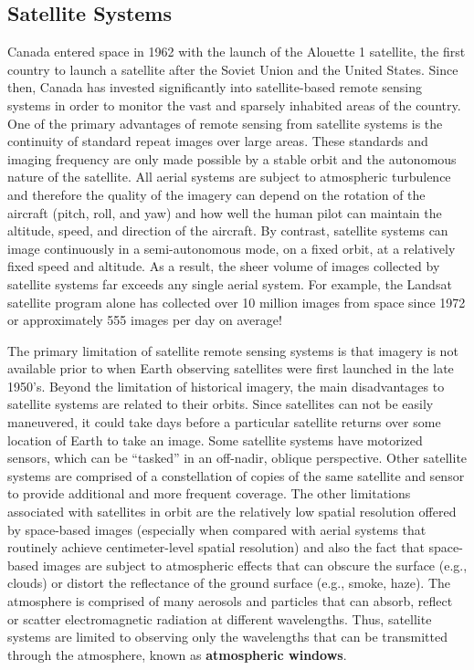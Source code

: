 \documentclass[
]{book}
\begin{document}
\hypertarget{satellite-systems}{%
\subsection{Satellite Systems}\label{satellite-systems}}

Canada entered space in 1962 with the launch of the Alouette 1 satellite, the first country to launch a satellite after the Soviet Union and the United States. Since then, Canada has invested significantly into satellite-based remote sensing systems in order to monitor the vast and sparsely inhabited areas of the country. One of the primary advantages of remote sensing from satellite systems is the continuity of standard repeat images over large areas. These standards and imaging frequency are only made possible by a stable orbit and the autonomous nature of the satellite. All aerial systems are subject to atmospheric turbulence and therefore the quality of the imagery can depend on the rotation of the aircraft (pitch, roll, and yaw) and how well the human pilot can maintain the altitude, speed, and direction of the aircraft. By contrast, satellite systems can image continuously in a semi-autonomous mode, on a fixed orbit, at a relatively fixed speed and altitude. As a result, the sheer volume of images collected by satellite systems far exceeds any single aerial system. For example, the Landsat satellite program alone has collected over 10 million images from space since 1972 or approximately 555 images per day on average!

The primary limitation of satellite remote sensing systems is that imagery is not available prior to when Earth observing satellites were first launched in the late 1950's. Beyond the limitation of historical imagery, the main disadvantages to satellite systems are related to their orbits. Since satellites can not be easily maneuvered, it could take days before a particular satellite returns over some location of Earth to take an image. Some satellite systems have motorized sensors, which can be ``tasked'' in an off-nadir, oblique perspective. Other satellite systems are comprised of a constellation of copies of the same satellite and sensor to provide additional and more frequent coverage. The other limitations associated with satellites in orbit are the relatively low spatial resolution offered by space-based images (especially when compared with aerial systems that routinely achieve centimeter-level spatial resolution) and also the fact that space-based images are subject to atmospheric effects that can obscure the surface (e.g., clouds) or distort the reflectance of the ground surface (e.g., smoke, haze). The atmosphere is comprised of many aerosols and particles that can absorb, reflect or scatter electromagnetic radiation at different wavelengths. Thus, satellite systems are limited to observing only the wavelengths that can be transmitted through the atmosphere, known as \textbf{atmospheric windows}.
\end{document}
